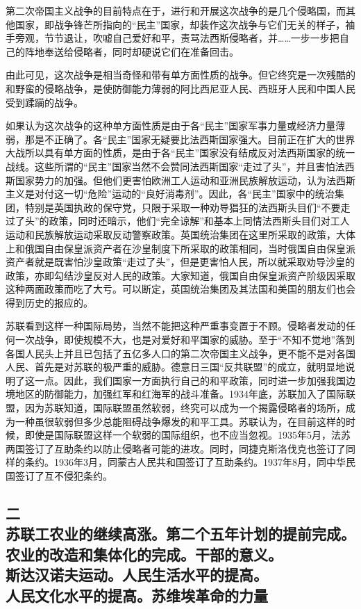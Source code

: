 第二次帝国主义战争的目前特点在于，进行和开展这次战争的是几个侵略国，而其他国家，即战争锋芒所指向的“民主”国家，却装作这次战争与它们无关的样子，袖手旁观，节节退让，吹嘘自己爱好和平，责骂法西斯侵略者，并……一步一步把自己的阵地奉送给侵略者，同时却硬说它们在准备回击。

由此可见，这次战争是相当奇怪和带有单方面性质的战争。但它终究是一次残酷的和野蛮的侵略战争，是使防御能力薄弱的阿比西尼亚人民、西班牙人民和中国人民受到蹂躏的战争。

如果认为这次战争的这种单方面性质是由于各“民主”国家军事力量或经济力量薄弱，那是不正确了。各“民主”国家无疑要比法西斯国家强大。目前正在扩大的世界大战所以具有单方面的性质，是由于各“民主”国家没有结成反对法西斯国家的统一战线。这些所谓的“民主”国家当然不会赞同法西斯国家“走过了头”，并且害怕法西斯国家势力的加强。但他们更害怕欧洲工人运动和亚洲民族解放运动，认为法西斯主义是对付这一切“危险”运动的“良好消毒剂”。因此，各“民主”国家中的统治集团，特别是英国执政的保守党，只限于采取一种劝导猖狂的法西斯头目们“不要走过了头”的政策，同时还暗示，他们“完全谅解”和基本上同情法西斯头目们对工人运动和民族解放运动采取反动警察政策。英国统治集团在这里所采取的政策，大体上和俄国自由保皇派资产者在沙皇制度下所采取的政策相同，当时俄国自由保皇派资产者就是既害怕沙皇政策“走过了头”，但是更害怕人民，所以就采取劝导沙皇的政策，亦即勾结沙皇反对人民的政策。大家知道，俄国自由保皇派资产阶级因采取这种两面政策而吃了大亏。可以断定，英国统治集团及其法国和美国的朋友们也会得到历史的报应的。

苏联看到这样一种国际局势，当然不能把这种严重事变置于不顾。侵略者发动的任何一次战争，即使规模不大，也是对爱好和平国家的威胁。至于“不知不觉地”落到各国人民头上并且已包括了五亿多人口的第二次帝国主义战争，更不能不是对各国人民、首先是对苏联的极严重的威胁。德意日三国“反共联盟”的成立，就明显地说明了这一点。因此，我们国家一方面执行自己的和平政策，同时进一步加强我国边境地区的防御能力，加强红军和红海军的战斗准备。1934年底，苏联加入了国际联盟，因为苏联知道，国际联盟虽然软弱，终究可以成为一个揭露侵略者的场所，成为一种虽很软弱但多少总能阻碍战争爆发的和平工具。苏联认为，在目前这样的时候，即使是国际联盟这样一个软弱的国际组织，也不应当忽视。1935年5月，法苏两国签订了互助条约以防止侵略者可能的进攻。同时，同捷克斯洛伐克也签订了同样的条约。1936年3月，同蒙古人民共和国签订了互助条约。1937年8月，同中华民国签订了互不侵犯条约。


\subsection[二\q 苏联工农业的继续高涨。第二个五年计划的提前完成。农业的改造和集体化的完成。干部的意义。斯达汉诺夫运动。人民生活水平的提高。人民文化水平的提高。苏维埃革命的力量]{二\\ 苏联工农业的继续高涨。第二个五年计划的提前完成。\\农业的改造和集体化的完成。干部的意义。\\斯达汉诺夫运动。人民生活水平的提高。\\人民文化水平的提高。苏维埃革命的力量}

